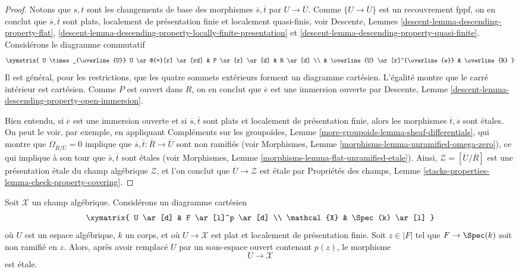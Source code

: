 \begin{proof}
\medskip\noindent
Notons que $s, t$ sont les changements de base des morphismes
$\overline{s}, \overline{t}$ par $U \to \overline{U}$.
Comme $\{U \to \overline{U}\}$ est un recouvrement fppf, on en conclut que
$\overline{s}, \overline{t}$ sont plats, localement de présentation finie et
localement quasi-finis, voir Descente, Lemmes
\ref{descent-lemma-descending-property-flat},
\ref{descent-lemma-descending-property-locally-finite-presentation} et
\ref{descent-lemma-descending-property-quasi-finite}.
Considérons le diagramme commutatif
$$
\xymatrix{
U \times_{\overline{U}} U \ar@{=}[r] \ar[rd] & P \ar[r] \ar[d] & R \ar[d] \\
& \overline{U} \ar[r]^{\overline{e}} & \overline{R}
}
$$
Il est général, pour les restrictions, que les quatre sommets extérieurs
forment un diagramme cartésien. L'égalité montre que le carré intérieur est
cartésien. Comme $P$ est ouvert dans $R$, on en conclut que $\overline{e}$
est une immersion ouverte par Descente,
Lemme \ref{descent-lemma-descending-property-open-immersion}.

\medskip\noindent
Bien entendu, si $\overline{e}$ est une immersion ouverte et si
$\overline{s}, \overline{t}$ sont plats et localement de présentation finie,
alors les morphismes $\overline{t}, \overline{s}$ sont étales.
On peut le voir, par exemple, en appliquant Compléments sur les groupoïdes,
Lemme \ref{more-groupoids-lemma-sheaf-differentials}, qui montre que
$\Omega_{\overline{R}/\overline{U}} = 0$ implique que
$\overline{s}, \overline{t} : \overline{R} \to \overline{U}$ sont non
ramifiés (voir Morphismes,
Lemme \ref{morphisms-lemma-unramified-omega-zero}), ce qui implique à son tour
que $\overline{s}, \overline{t}$ sont étales (voir Morphismes,
Lemme \ref{morphisms-lemma-flat-unramified-etale}).
Ainsi, $\mathcal{Z} = [\overline{U}/\overline{R}]$ est une présentation étale
du champ algébrique $\mathcal{Z}$, et l'on conclut que
$\overline{U} \to \mathcal{Z}$ est étale par Propriétés des champs, Lemme
\ref{stacks-properties-lemma-check-property-covering}.
\end{proof}

\begin{lemma}
\label{lemma-etale-at-point}
Soit $\mathcal{X}$ un champ algébrique. Considérons un diagramme cartésien
$$
\xymatrix{
U \ar[d] & F \ar[l]^p \ar[d] \\
\mathcal{X} & \Spec(k) \ar[l]
}
$$
où $U$ est un espace algébrique, $k$ un corps, et où $U \to \mathcal{X}$ est
plat et localement de présentation finie. Soit $z \in |F|$ tel que
$F \to \Spec(k)$ soit non ramifié en $z$. Alors, après avoir remplacé $U$ par
un sous-espace ouvert contenant $p(z)$, le morphisme
$$
U \longrightarrow \mathcal{X}
$$
est étale.
\end{lemma}

